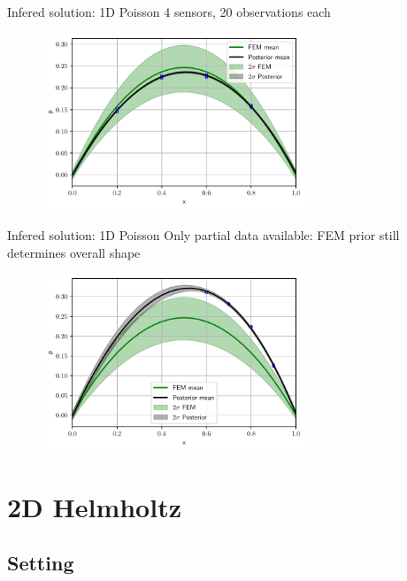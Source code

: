 \documentclass[fleqn,11pt,aspectratio=43]{beamer}
\begin{document}
\begin{frame}{Infered solution: 1D Poisson}
4 sensors, 20 observations each
      	\begin{figure}[h]
		\begin{center}
		\includegraphics[width=0.7\textwidth]{1DPost_4P20O}
		\end{center}
		\end{figure}

	\end{frame}

\begin{frame}{Infered solution: 1D Poisson}
Only partial data available: FEM prior still determines overall shape
      	\begin{figure}[h]
		\begin{center}
		\includegraphics[width=0.7\textwidth]{1DPost_RightSide}
		\end{center}
		\end{figure}

	\end{frame}
\section{2D Helmholtz}
\subsection{Setting}
\end{document}
